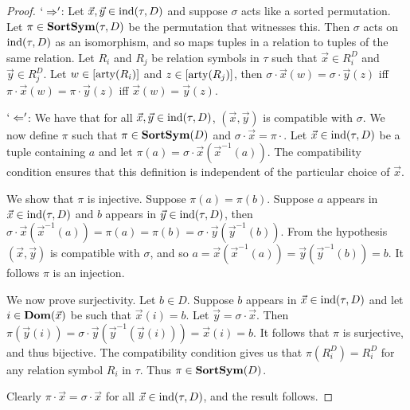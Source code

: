 \documentclass[../paper.tex]{subfiles}
\begin{document}
\begin{proof}
  $`\Rightarrow'$: Let $\vec{x}, \vec{y} \in \text{\upshape ind}(\tau, D)$ and suppose $\sigma$
  acts like a sorted permutation. Let $\pi \in \text{\textbf{SortSym}}(\tau, D)$ be the
  permutation that witnesses this. Then $\sigma$ acts on $\text{\upshape ind} (\tau, D)$ as an
  isomorphism, and so maps tuples in a relation to tuples of the same relation.
  Let $R_i$ and $R_j$ be relation symbols in $\tau$ such that $\vec{x} \in
  R^D_i$ and $\vec{y} \in R^D_j$. Let $w \in [\mathrm{arty} (R_i)]$ and $z \in [\mathrm{arty}
  (R_j)]$, then $\sigma \cdot \vec{x} (w) = \sigma \cdot \vec{y}(z)$ iff $\pi
  \cdot \vec{x}(w) = \pi \cdot \vec{y}(z)$ iff $\vec{x}(w) = \vec{y}(z)$.


  
  $`\Leftarrow'$: We have that for all $\vec{x}, \vec{y} \in \text{\upshape ind}(\tau, D)$,
  $(\vec{x}, \vec{y})$ is compatible with $\sigma$. We now define $\pi$ such
  that $\pi \in \text{\textbf{SortSym}}(D)$ and $\sigma \cdot \vec{x} = \pi \cdot$. Let
  $\vec{x} \in \text{\upshape ind}(\tau, D)$ be a tuple containing $a$ and let $\pi (a) =
  \sigma \cdot \vec{x} (\vec{x}^{-1}(a))$. The compatibility condition ensures
  that this definition is independent of the particular choice of $\vec{x}$.
  
  We show that $\pi$ is injective. Suppose $\pi(a) = \pi(b)$. Suppose $a$
  appears in $\vec{x} \in \text{\upshape ind}(\tau, D)$ and $b$ appears in $\vec{y} \in
  \text{\upshape ind}(\tau, D)$, then $\sigma \cdot \vec{x} (\vec{x}^{-1}(a)) = \pi (a) =
  \pi(b) = \sigma \cdot \vec{y}(\vec{y}^{-1}(b))$. From the hypothesis
  $(\vec{x}, \vec{y})$ is compatible with $\sigma$, and so $a =
  \vec{x}(\vec{x}^{-1}(a)) = \vec{y}(\vec{y}^{-1}(b)) = b$. It follows $\pi$ is
  an injection.

  
  We now prove surjectivity. Let $b \in D$. Suppose $b$ appears in $\vec{x} \in
  \text{\upshape ind}(\tau, D)$ and let $i \in \text{\textbf{Dom}}(\vec{x})$ be such that $\vec{x}(i) = b$.
  Let $\vec{y} = \sigma \cdot \vec{x}$. Then $\pi (\vec{y}(i)) = \sigma \cdot
  \vec{y} (\vec{y}^{-1}(\vec{y}(i))) = \vec{x}(i) = b$. It follows that $\pi$ is
  surjective, and thus bijective. The compatibility condition gives us that $\pi
  (R^D_i) = R^D_i$ for any relation symbol $R_i$ in $\tau$. Thus $\pi \in
  \text{\textbf{SortSym}}(D)$.

  Clearly $\pi \cdot \vec{x} = \sigma \cdot \vec{x}$ for all $\vec{x} \in
  \text{\upshape ind}(\tau, D)$, and the result follows.
\end{proof}
\end{document}
